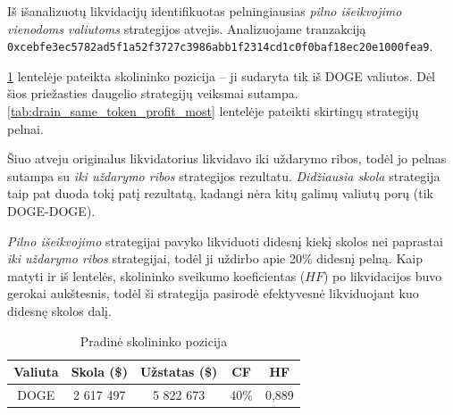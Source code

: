 \documentclass[]{VUMIFTemplateClass}
\begin{document}

Iš išanalizuotų likvidacijų identifikuotas pelningiausias \textit{pilno išeikvojimo vienodoms valiutoms} strategijos atvejis. Analizuojame tranzakciją \\ \texttt{0xcebfe3ec5782ad5f1a52f3727c3986abb1f2314cd1c0f0baf18ec20e1000fea9}.

\ref{tab:drain_same_token_position_most} lentelėje pateikta skolininko pozicija – ji sudaryta tik iš DOGE valiutos. Dėl šios priežasties daugelio strategijų veiksmai sutampa. \ref{tab:drain_same_token_profit_most} lentelėje pateikti skirtingų strategijų pelnai.

Šiuo atveju originalus likvidatorius likvidavo iki uždarymo ribos, todėl jo pelnas sutampa su \textit{iki uždarymo ribos} strategijos rezultatu. \textit{Didžiausia skola} strategija taip pat duoda tokį patį rezultatą, kadangi nėra kitų galimų valiutų porų (tik DOGE-DOGE).

\textit{Pilno išeikvojimo} strategijai pavyko likviduoti didesnį kiekį skolos nei paprastai \textit{iki uždarymo ribos} strategijai, todėl ji uždirbo apie 20\% didesnį pelną. Kaip matyti ir iš lentelės, skolininko sveikumo koeficientas ($HF$) po likvidacijos buvo gerokai aukštesnis, todėl ši strategija pasirodė efektyvesnė likviduojant kuo didesnę skolos dalį.

\begin{table}[H]
\centering
\caption{Pradinė skolininko pozicija}
\label{tab:drain_same_token_position_most}
\begin{tabular}{|c|c|c|c|c|}
\hline
\textbf{Valiuta} & \textbf{Skola (\$)} & \textbf{Užstatas (\$)} & \textbf{CF} & \textbf{HF} \\ \hline
DOGE &  2 617 497   &  5 822 673       & 40\% & 0,889 \\ \hline
\end{tabular}
\end{table}
\end{document}
